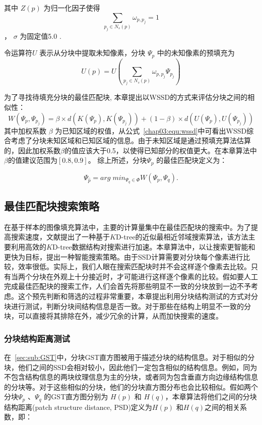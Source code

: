  其中 \(Z(p)\) 为归一化因子使得 $$\sum_{p_j\in N_s(p)}\omega_{p,p_j} = 1$$ ， \(\sigma\) 为固定值5.0 \cite{Xu:2010}.\par
 令运算符\(U\) 表示从分块中提取未知像素，分块 \(\Psi_p\) 中的未知像素的预填充为
 $$U(p)=U\left(\sum_{p_j \in N_s(p)}{\omega_{p,p_j}\Psi_{p_j}}\right)$$\par
 为了寻找待填充分块的最佳匹配块, 本章提出以WSSD的方式来评估分块之间的相似性：
 \begin{equation}
 W(\Psi_p,\Psi_{p_j})=\beta\times d(K(\Psi_p),K(\Psi_{p_j}))+(1-\beta)\times d(U(\Psi_p),U(\Psi_{p_j}))
 \label{chap03:equ:wssd}
 \end{equation}
 其中加权系数 \(\beta\) 为已知区域的权值，从公式~\ref{chap03:equ:wssd}中可看出WSSD综合考虑了分块未知区域和已知区域的信息。由于未知区域是通过预填充算法估算的，因此加权系数\(\beta\)的值应该大于0.5，以使得已知部分的权值更大。在本章算法中 \(\beta\)的值建议范围为$[0.8, 0.9]$。 综上所述，分块\(\Psi_p\) 的最佳匹配块定义为：


 $$\Psi_{\hat{p}}=arg\;min_{\Psi_q \in \Phi}{W(\Psi_p,\Psi_q)}.$$


 \subsection{最佳匹配块搜索策略}
 在基于样本的图像填充算法中，主要的计算量集中在最佳匹配块的搜索中。为了提高搜索速度，文献\cite{kwokFast}提出了一种基于$K$D-tree的近似最相近邻域搜索算法，该方法主要利用高效的$K$D-tree数据结构对搜索进行加速。本章算法中，以让搜索更智能和更快为目标，提出一种智能搜索策略。由于SSD计算需要对分块每个像素进行比较，效率很低。实际上，我们人眼在搜索匹配块时并不会这样逐个像素去比较。只有当两个分块在外观上十分接近时，才可能进行这样逐个像素的比较。假如要人工完成最佳匹配块的搜索工作，人们会首先将那些明显不一致的分块放到一边不予考虑。这个预先判断和筛选的过程非常重要，本章提出利用分块结构测试的方式对分块进行测试，判断分块间结构信息是否一致。对于那些在结构上明显不一致的分块，可以直接将其排除在外，减少冗余的计算，从而加快搜索的速度。
 \subsubsection{分块结构距离测试}
 \label{sec:subsub:PST}
 在~\ref{sec:sub:GST}中，分块GST直方图被用于描述分块的结构信息。对于相似的分块，他们之间的SSD会相对较小，因此他们一定包含相似的结构信息。例如，同为不包含结构信息的两块纹理信息为主的分块，或者同为包含垂直方向边缘结构信息的分块等。对于这些相似的分块，他们的分块直方图分布也会比较相似。假如两个分块\(\Psi_p\) 、\(\Psi_q\) 的GST直方图分别为 \(H(p)\) 和 \(H(q)\)，本章算法将他们之间的分块结构距离(patch structure distance, PSD)定义为\(H(p)\) 和\(H(q)\)之间的相关系数，即：

